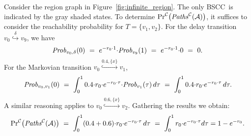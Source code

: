 \documentclass{LMCS}
\newcommand{\<}{\langle}
\renewcommand{\>}{\rangle}
\newcommand{\les}{\leqslant}
\newcommand{\mG}{\mathcal{G}}
\newcommand{\mC}{\mathcal{C}}
\newcommand{\mA}{\mathcal{A}}
\newcommand{\BSCC}{\textsc{BSCC}}
\newcommand{\Paths}{{\it Paths}}
\newcommand{\Prob}{{\it Prob}}
\begin{document}
\iffalse
\begin{figure}\begin{center}
\scalebox{0.7}{

\begin{picture}(124,44)(0,-44)
\put(0,-44){}
\node[Nmarks=i,Nw=22.74,Nmr=0.0](n57)(34.26,-12.03){$\ell_0,0{\les} x{<}1$}

\node[Nfill=y,fillgray=0.8,Nw=22.74,Nmr=0.0](n61)(14.57,-32.03){$\ell_4,0{\les} x{<}1$}

\node[Nframe=n](n64)(36.07,-5.03){$v_0,r_0$}

\node[Nframe=n](n65)(8.04,-25.03){$v_1,r_1$}

\node[Nframe=n](n66)(64.04,-25.03){$v_2,r_3$}

\node[Nfill=y,fillgray=0.8,Nw=22.74,Nmr=0.0](n53)(54.04,-32.03){$\ell_5,0{\les} x{<}1$}

\node[Nw=22.74,Nmr=0.0](n272)(108.27,-12.03){$\ell_0,1{\les} x{<}2$}

\drawedge(n57,n53){$0.6$}

\drawedge[ELside=r,ELdist=1.03](n57,n61){$0.4$}

\drawedge(n57,n272){$\delta$}

\node[Nframe=n](n312)(108.41,-5.03){$v_9,r_0$}

\drawloop[loopangle=-90.0](n61){$1$}

\drawloop[loopangle=270.0](n53){$1$}

\drawloop[loopangle=-90.0](n272){$1$}



\end{picture}
 }\end{center}\vspace{-0.2cm}\caption{The transformed region graph
$\mG^\omega_{abs}$\label{fig:DMTA_Muller_p_abs}}
\end{figure}
\fi

\begin{exa}
Consider the region graph in Figure~\ref{fig:infinite_region}.  The only \BSCC\
is indicated by the gray shaded states.  To determine ${\Pr}^{\mC}\big(
\Paths^{\mC}(\mA) \big)$, it suffices to consider the reachability probability for
$T = \{ v_1, v_2 \}$.
For the delay transition $v_0 \stackrel{\delta}{\hookrightarrow} v_9$, we
have
$$
\Prob_{v_0,\delta}(0) \ = \ e^{-r_0{\cdot}1}{\cdot}\Prob_{v_9}(1) \ = \
  e^{-r_0{\cdot}1}{\cdot}0 \ = \ 0.
$$
For the Markovian transition $v_0\stackrel{0.4,\{x\}}{\hookrightarrow}v_1$,
$$
\Prob_{v_0,v_1}(0)
\ = \
\int_0^10.4{\cdot} r_0{\cdot}e^{-r_0{\cdot}\tau}{\cdot}\Prob_{v_1}(\tau) \, d\tau
\ = \
\int_0^10.4{\cdot} r_0{\cdot}e^{-r_0{\cdot}\tau} \, d\tau.
$$
A similar reasoning applies to $v_0\stackrel{0.6,\{x\}}{\hookrightarrow}v_2$.
Gathering the results we obtain:
$$
{\Pr}^\mC \big( \Paths^\mC(\mA) \big)
\ = \
\int_0^1(0.4+0.6){\cdot} r_0{\cdot}e^{-r_0{\cdot}\tau} \, d\tau
\ = \
\int_0^1 r_0{\cdot}e^{-r_0{\cdot}\tau}d\tau=1-e^{-r_0}.
$$
\end{exa}
\end{document}
